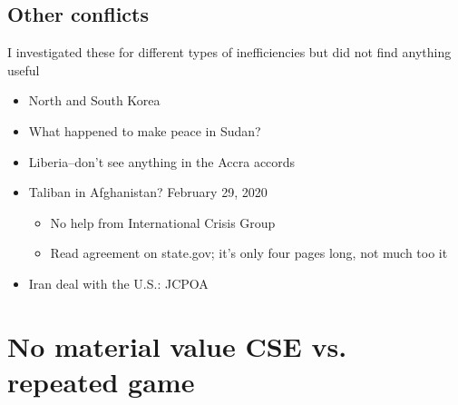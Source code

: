 \documentclass[12pt]{article}
\begin{document}
\subsection{Other conflicts}
I investigated these for different types of inefficiencies but did not find anything useful
\begin{itemize}	
	\item North and South Korea
	\item What happened to make peace in Sudan?
	\item Liberia--don't see anything in the Accra accords
	\item Taliban in Afghanistan? February 29, 2020
		\begin{itemize}
			\item No help from International Crisis Group
			\item Read agreement on state.gov; it's only four pages long, not much too it
		\end{itemize}
	\item Iran deal with the U.S.: JCPOA
\end{itemize}

\section{No material value CSE vs. repeated game}
\end{document}
